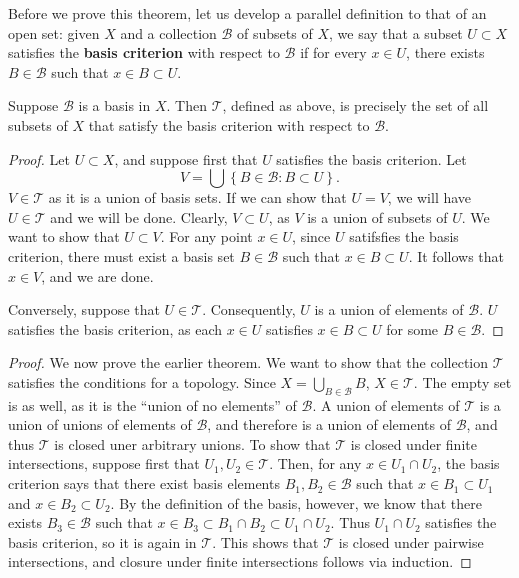 \documentclass{mathnotes}
\begin{document}
Before we prove this theorem, let us develop a parallel definition to that of an open set: given $X$ and a collection $\mathcal{B}$ of subsets of $X$,
we say that a subset $U\subset X$ satisfies the \textbf{basis criterion} with respect to $\mathcal{B}$ if for every $x\in U$,
there exists $B\in\mathcal{B}$ such that $x\in B\subset U.$

\begin{lem}
    Suppose $\mathcal{B}$ is a basis in $X$. Then $\mathcal{T}$, defined as above, is precisely the set of all subsets of $X$ that
    satisfy the basis criterion with respect to $\mathcal{B}$.
\end{lem}
\begin{proof}
    Let $U\subset X$, and suppose first that $U$ satisfies the basis criterion. Let
    \[V=\bigcup\left\{ B\in\mathcal{B}:B\subset U \right\}.\]
    $V\in\mathcal{T}$ as it is a union of basis sets. If we can show that $U=V$, we will have $U\in\mathcal{T}$ and we will be done.
    Clearly, $V\subset U$, as $V$ is a union of subsets of $U$. We want to show that $U\subset V$. For any point $x\in U$, since $U$
    satifsfies the basis criterion, there must exist a basis set $B\in\mathcal{B}$ such that $x\in B\subset U$. It follows that $x\in V$,
    and we are done.

    Conversely, suppose that $U\in\mathcal{T}$. Consequently, $U$ is a union of elements of $\mathcal{B}$. $U$ satisfies the basis
    criterion, as each $x\in U$ satisfies $x\in B\subset U$ for some $B\in\mathcal{B}$.
\end{proof}

\begin{proof}
    We now prove the earlier theorem. We want to show that the collection $\mathcal{T}$ satisfies the conditions for a topology.
    Since $X=\bigcup_{B\in\mathcal{B}}B$, $X\in\mathcal{T}$. The empty set is as well, as it is the ``union of no elements'' of
    $\mathcal{B}$. A union of elements of $\mathcal{T}$ is a union of unions of elements of $\mathcal{B}$, and therefore is
    a union of elements of $\mathcal{B}$, and thus $\mathcal{T}$ is closed uner arbitrary unions. To show that $\mathcal{T}$ is closed
    under finite intersections, suppose first that $U_1, U_2\in\mathcal{T}$. Then, for any $x\in U_1\cap U_2$, the basis criterion
    says that there exist basis elements $B_1, B_2\in\mathcal{B}$ such that $x\in B_1\subset U_1$ and $x\in B_2\subset U_2$.
    By the definition of the basis, however, we know that there exists $B_3\in\mathcal{B}$ such that
    $x\in B_3\subset B_1\cap B_2\subset U_1 \cap U_2$. Thus $U_1\cap U_2$ satisfies the basis criterion, so it is again in $\mathcal{T}$.
    This shows that $\mathcal{T}$ is closed under pairwise intersections, and closure under finite intersections follows via induction.
\end{proof}
\end{document}

